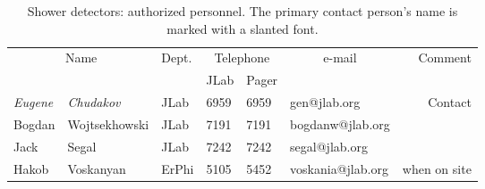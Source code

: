  \begin{table}[ht]
\begin{center}
\begin{tabular}{|ll|l|l|l|l|r|} \hline
  \multicolumn{2}{|c|}{Name} & Dept. & \multicolumn{2}{c|}{Telephone} & 
  \multicolumn{1}{c|}{e-mail} & Comment \\ 
  \cline{4-5}
   &  &   & JLab & Pager &  & \\ 
\hline
 {\em Eugene} & {\em Chudakov}  & JLab    & 6959 & 6959 & gen@jlab.org      & Contact     \\ 
 Bogdan       & Wojtsekhowski   & JLab    & 7191 & 7191 & bogdanw@jlab.org  &  \\ 
 Jack         & Segal           & JLab    & 7242 & 7242 & segal@jlab.org    &  \\ 
 Hakob        & Voskanyan       & ErPhi   & 5105 & 5452 & voskania@jlab.org & when on site \\ 
\hline
\end{tabular}
\end{center}
\caption[Shower detectors: authorized personnel]{
   Shower detectors: authorized personnel. The primary contact person's
   name is marked with a slanted font. 
}
\label{tab:shower-personnel}
\end{table}
 

%
%
%
%
%

